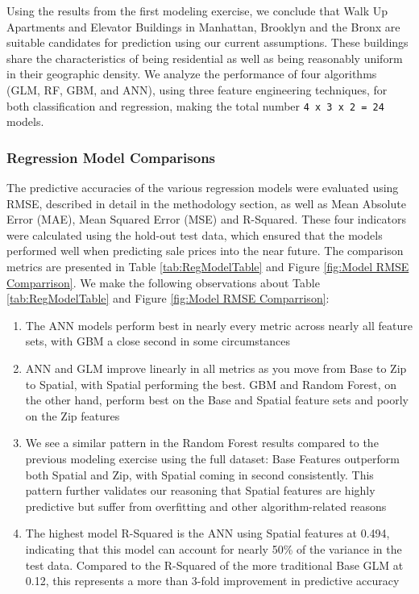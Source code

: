 \documentclass[12pt,]{article}
\providecommand{\tightlist}{%
  \setlength{\itemsep}{0pt}\setlength{\parskip}{0pt}}
\begin{document}
Using the results from the first modeling exercise, we conclude that
Walk Up Apartments and Elevator Buildings in Manhattan, Brooklyn and the
Bronx are suitable candidates for prediction using our current
assumptions. These buildings share the characteristics of being
residential as well as being reasonably uniform in their geographic
density. We analyze the performance of four algorithms (GLM, RF, GBM,
and ANN), using three feature engineering techniques, for both
classification and regression, making the total number
\texttt{4\ x\ 3\ x\ 2\ =\ 24} models.

\hypertarget{regression-model-comparisons}{%
\subsubsection{Regression Model
Comparisons}\label{regression-model-comparisons}}

The predictive accuracies of the various regression models were
evaluated using RMSE, described in detail in the methodology section, as
well as Mean Absolute Error (MAE), Mean Squared Error (MSE) and
R-Squared. These four indicators were calculated using the hold-out test
data, which ensured that the models performed well when predicting sale
prices into the near future. The comparison metrics are presented in
Table \ref{tab:RegModelTable} and Figure
\ref{fig:Model RMSE Comparrison}. We make the following observations
about Table \ref{tab:RegModelTable} and Figure
\ref{fig:Model RMSE Comparrison}:

\begin{enumerate}
\def\labelenumi{\arabic{enumi})}
\tightlist
\item
  The ANN models perform best in nearly every metric across nearly all
  feature sets, with GBM a close second in some circumstances
\item
  ANN and GLM improve linearly in all metrics as you move from Base to
  Zip to Spatial, with Spatial performing the best. GBM and Random
  Forest, on the other hand, perform best on the Base and Spatial
  feature sets and poorly on the Zip features
\item
  We see a similar pattern in the Random Forest results compared to the
  previous modeling exercise using the full dataset: Base Features
  outperform both Spatial and Zip, with Spatial coming in second
  consistently. This pattern further validates our reasoning that
  Spatial features are highly predictive but suffer from overfitting and
  other algorithm-related reasons
\item
  The highest model R-Squared is the ANN using Spatial features at
  0.494, indicating that this model can account for nearly 50\% of the
  variance in the test data. Compared to the R-Squared of the more
  traditional Base GLM at 0.12, this represents a more than 3-fold
  improvement in predictive accuracy
\end{enumerate}
\end{document}
